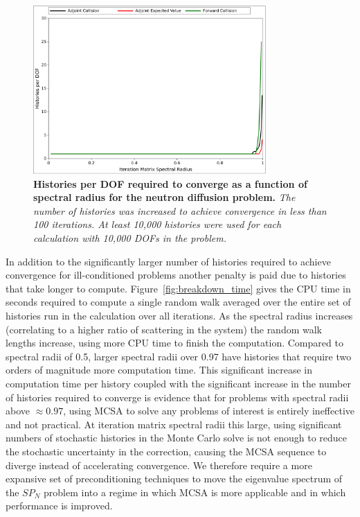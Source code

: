 \documentclass[letterpaper,11pt]{article}
\begin{document}
\begin{figure}[t!]
  \begin{center}
    \includegraphics[width=3.5in]{breakdown_histories.pdf}
  \end{center}
  \caption{\textbf{Histories per DOF required to converge as a
      function of spectral radius for the neutron diffusion problem.}
    \textit{The number of histories was increased to achieve
      convergence in less than 100 iterations. At least 10,000
      histories were used for each calculation with 10,000 DOFs in the
      problem.}}
  \label{fig:breakdown_histories}
\end{figure}

In addition to the significantly larger number of histories required
to achieve convergence for ill-conditioned problems another penalty is
paid due to histories that take longer to
compute. Figure~\ref{fig:breakdown_time} gives the CPU time in seconds
required to compute a single random walk averaged over the entire set
of histories run in the calculation over all iterations. As the
spectral radius increases (correlating to a higher ratio of scattering
in the system) the random walk lengths increase, using more CPU time
to finish the computation. Compared to spectral radii of 0.5, larger
spectral radii over 0.97 have histories that require two orders of
magnitude more computation time. This significant increase in
computation time per history coupled with the significant increase in
the number of histories required to converge is evidence that for
problems with spectral radii above $\approx 0.97$, using MCSA to solve
any problems of interest is entirely ineffective and not practical. At
iteration matrix spectral radii this large, using significant numbers
of stochastic histories in the Monte Carlo solve is not enough to
reduce the stochastic uncertainty in the correction, causing the MCSA
sequence to diverge instead of accelerating convergence. We therefore
require a more expansive set of preconditioning techniques to move the
eigenvalue spectrum of the $SP_N$ problem into a regime in which MCSA
is more applicable and in which performance is improved.
\end{document}
